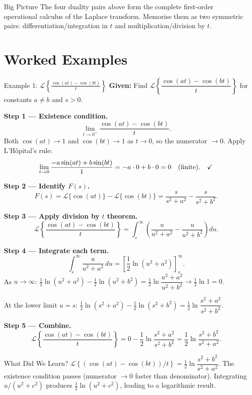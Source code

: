 \documentclass[12pt,a4paper]{article}
\begin{document}
\begin{learnbox}{Big Picture}
The four duality pairs above form the complete first-order operational calculus
of the Laplace transform. Memorise them as two symmetric pairs:
differentiation/integration in $t$ and multiplication/division by $t$.
\end{learnbox}

\section{Worked Examples}

\begin{infobox}{Example 1: $\mathcal{L}\!\left\{\frac{\cos(at)-\cos(bt)}{t}\right\}$}
\textbf{Given:} Find $\mathcal{L}\!\left\{\dfrac{\cos(at)-\cos(bt)}{t}\right\}$
for constants $a\neq b$ and $s>0$.

\textbf{Step 1 --- Existence condition.}
\[
  \lim_{t\to 0^+}\frac{\cos(at)-\cos(bt)}{t}.
\]
Both $\cos(at)\to 1$ and $\cos(bt)\to 1$ as $t\to 0$, so the numerator $\to 0$.
Apply L'H\^{o}pital's rule:
\[
  \lim_{t\to 0}\frac{-a\sin(at)+b\sin(bt)}{1}
  = -a\cdot 0 + b\cdot 0 = 0 \quad(\text{finite}). \quad\text{\checkmark}
\]

\textbf{Step 2 --- Identify $F(s)$.}
\[
  F(s)
  = \mathcal{L}\{\cos(at)\} - \mathcal{L}\{\cos(bt)\}
  = \frac{s}{s^2+a^2} - \frac{s}{s^2+b^2}.
\]

\textbf{Step 3 --- Apply division by $t$ theorem.}
\[
  \mathcal{L}\!\left\{\frac{\cos(at)-\cos(bt)}{t}\right\}
  = \int_s^\infty\!\!\left(\frac{u}{u^2+a^2} - \frac{u}{u^2+b^2}\right) du.
\]

\textbf{Step 4 --- Integrate each term.}
\[
  \int_s^\infty \frac{u}{u^2+a^2}\,du
  = \left[\frac{1}{2}\ln(u^2+a^2)\right]_s^\infty.
\]
As $u\to\infty$: $\frac{1}{2}\ln(u^2+a^2) - \frac{1}{2}\ln(u^2+b^2)
= \frac{1}{2}\ln\dfrac{u^2+a^2}{u^2+b^2} \to \frac{1}{2}\ln 1 = 0$.

At the lower limit $u=s$:
$\frac{1}{2}\ln(s^2+a^2) - \frac{1}{2}\ln(s^2+b^2)
= \frac{1}{2}\ln\dfrac{s^2+a^2}{s^2+b^2}$.

\textbf{Step 5 --- Combine.}
\[
  \mathcal{L}\!\left\{\frac{\cos(at)-\cos(bt)}{t}\right\}
  = 0 - \frac{1}{2}\ln\frac{s^2+a^2}{s^2+b^2}
  = \frac{1}{2}\ln\frac{s^2+b^2}{s^2+a^2}.
\]
\end{infobox}

\begin{learnbox}{What Did We Learn?}
$\mathcal{L}\!\left\{(\cos(at)-\cos(bt))/t\right\} = \frac{1}{2}\ln\dfrac{s^2+b^2}{s^2+a^2}$.
The existence condition passes (numerator $\to 0$ faster than denominator).
Integrating $u/(u^2+c^2)$ produces $\frac{1}{2}\ln(u^2+c^2)$, leading to a
logarithmic result.
\end{learnbox}
\end{document}
